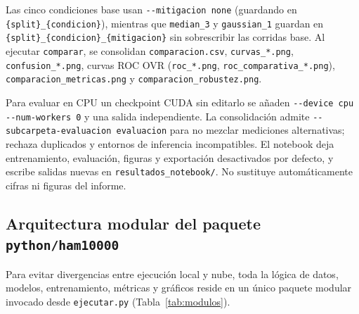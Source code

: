 Las cinco condiciones base usan \texttt{-{}-mitigacion none} (guardando en \texttt{\{split\}\_\allowbreak\{condicion\}}), mientras que \texttt{median\_3} y \texttt{gaussian\_1} guardan en \texttt{\{split\}\_\allowbreak\{condicion\}\_\allowbreak\{mitigacion\}} sin sobrescribir las corridas base. Al ejecutar \texttt{comparar}, se consolidan \texttt{comparacion.csv}, \texttt{curvas\_*.png}, \texttt{confusion\_*.png}, curvas ROC OVR (\texttt{roc\_*.png}, \texttt{roc\_\allowbreak comparativa\_*.png}), \texttt{comparacion\_\allowbreak metricas.png} y \texttt{comparacion\_\allowbreak robustez.png}.

Para evaluar en CPU un checkpoint CUDA sin editarlo se añaden \texttt{-{}-device cpu -{}-num-workers 0} y una salida independiente. La consolidación admite \texttt{-{}-subcarpeta-evaluacion evaluacion} para no mezclar mediciones alternativas; rechaza duplicados y entornos de inferencia incompatibles. El notebook deja entrenamiento, evaluación, figuras y exportación desactivados por defecto, y escribe salidas nuevas en \texttt{resultados\_notebook/}. No sustituye automáticamente cifras ni figuras del informe.

\subsection{Arquitectura modular del paquete \texttt{python/ham10000}}
Para evitar divergencias entre ejecución local y nube, toda la lógica de datos, modelos, entrenamiento, métricas y gráficos reside en un único paquete modular invocado desde \texttt{ejecutar.py} (Tabla~\ref{tab:modulos}).

